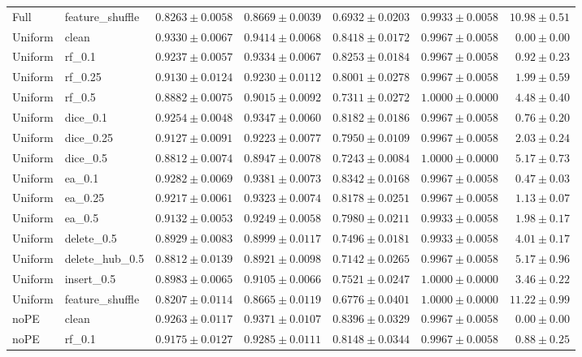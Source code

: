 \documentclass[UTF8,a4paper,11pt,fontset=fandol]{ctexart}
\begin{document}
{\begin{longtable}{llrrrrr}
Full & feature\_shuffle & $0.8263\pm0.0058$ & $0.8669\pm0.0039$ & $0.6932\pm0.0203$ & $0.9933\pm0.0058$ & $10.98\pm0.51$ \\
Uniform & clean & $0.9330\pm0.0067$ & $0.9414\pm0.0068$ & $0.8418\pm0.0172$ & $0.9967\pm0.0058$ & $0.00\pm0.00$ \\
Uniform & rf\_0.1 & $0.9237\pm0.0057$ & $0.9334\pm0.0067$ & $0.8253\pm0.0184$ & $0.9967\pm0.0058$ & $0.92\pm0.23$ \\
Uniform & rf\_0.25 & $0.9130\pm0.0124$ & $0.9230\pm0.0112$ & $0.8001\pm0.0278$ & $0.9967\pm0.0058$ & $1.99\pm0.59$ \\
Uniform & rf\_0.5 & $0.8882\pm0.0075$ & $0.9015\pm0.0092$ & $0.7311\pm0.0272$ & $1.0000\pm0.0000$ & $4.48\pm0.40$ \\
Uniform & dice\_0.1 & $0.9254\pm0.0048$ & $0.9347\pm0.0060$ & $0.8182\pm0.0186$ & $0.9967\pm0.0058$ & $0.76\pm0.20$ \\
Uniform & dice\_0.25 & $0.9127\pm0.0091$ & $0.9223\pm0.0077$ & $0.7950\pm0.0109$ & $0.9967\pm0.0058$ & $2.03\pm0.24$ \\
Uniform & dice\_0.5 & $0.8812\pm0.0074$ & $0.8947\pm0.0078$ & $0.7243\pm0.0084$ & $1.0000\pm0.0000$ & $5.17\pm0.73$ \\
Uniform & ea\_0.1 & $0.9282\pm0.0069$ & $0.9381\pm0.0073$ & $0.8342\pm0.0168$ & $0.9967\pm0.0058$ & $0.47\pm0.03$ \\
Uniform & ea\_0.25 & $0.9217\pm0.0061$ & $0.9323\pm0.0074$ & $0.8178\pm0.0251$ & $0.9967\pm0.0058$ & $1.13\pm0.07$ \\
Uniform & ea\_0.5 & $0.9132\pm0.0053$ & $0.9249\pm0.0058$ & $0.7980\pm0.0211$ & $0.9933\pm0.0058$ & $1.98\pm0.17$ \\
Uniform & delete\_0.5 & $0.8929\pm0.0083$ & $0.8999\pm0.0117$ & $0.7496\pm0.0181$ & $0.9933\pm0.0058$ & $4.01\pm0.17$ \\
Uniform & delete\_hub\_0.5 & $0.8812\pm0.0139$ & $0.8921\pm0.0098$ & $0.7142\pm0.0265$ & $0.9967\pm0.0058$ & $5.17\pm0.96$ \\
Uniform & insert\_0.5 & $0.8983\pm0.0065$ & $0.9105\pm0.0066$ & $0.7521\pm0.0247$ & $1.0000\pm0.0000$ & $3.46\pm0.22$ \\
Uniform & feature\_shuffle & $0.8207\pm0.0114$ & $0.8665\pm0.0119$ & $0.6776\pm0.0401$ & $1.0000\pm0.0000$ & $11.22\pm0.99$ \\
noPE & clean & $0.9263\pm0.0117$ & $0.9371\pm0.0107$ & $0.8396\pm0.0329$ & $0.9967\pm0.0058$ & $0.00\pm0.00$ \\
noPE & rf\_0.1 & $0.9175\pm0.0127$ & $0.9285\pm0.0111$ & $0.8148\pm0.0344$ & $0.9967\pm0.0058$ & $0.88\pm0.25$ \\

\end{longtable}}
\end{document}
